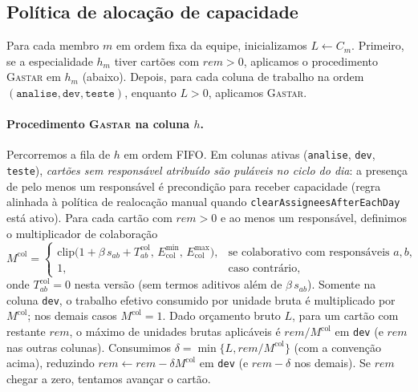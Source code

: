 \subsection{Política de alocação de capacidade}
Para cada membro $m$ em ordem fixa da equipe, inicializamos $L\leftarrow C_m$. Primeiro, se a especialidade $h_m$ tiver cartões com $\textit{rem}>0$, aplicamos o procedimento \textsc{Gastar} em $h_m$ (abaixo). Depois, para cada coluna de trabalho na ordem $(\texttt{analise},\texttt{dev},\texttt{teste})$, enquanto $L>0$, aplicamos \textsc{Gastar}.

\paragraph{Procedimento \textsc{Gastar} na coluna $h$.}
Percorremos a fila de $h$ em ordem FIFO. Em colunas ativas (\texttt{analise}, \texttt{dev}, \texttt{teste}), \emph{cartões sem responsável atribuído são puláveis no ciclo do dia}: a presença de pelo menos um responsável é precondição para receber capacidade (regra alinhada à política de realocação manual quando \texttt{clearAssigneesAfterEachDay} está ativo). Para cada cartão com $\textit{rem}>0$ e ao menos um responsável, definimos o multiplicador de colaboração
\[
M^{\text{col}} =
\begin{cases}
\mathrm{clip}\big(1+\beta\, s_{ab} + T^{\text{col}}_{ab},\,E^{\min}_{\text{col}},\,E^{\max}_{\text{col}}\big), & \text{se colaborativo com responsáveis }a,b,\\
1, & \text{caso contrário},
\end{cases}
\]
onde $T^{\text{col}}_{ab}=0$ nesta versão (sem termos aditivos além de $\beta\,s_{ab}$). Somente na coluna \texttt{dev}, o trabalho efetivo consumido por unidade bruta é multiplicado por $M^{\text{col}}$; nos demais casos $M^{\text{col}}=1$. Dado orçamento bruto $L$, para um cartão com restante $\textit{rem}$, o máximo de unidades brutas aplicáveis é $\textit{rem}/M^{\text{col}}$ em \texttt{dev} (e $\textit{rem}$ nas outras colunas). Consumimos $\delta=\min\{L,\textit{rem}/M^{\text{col}}\}$ (com a convenção acima), reduzindo $\textit{rem}\leftarrow \textit{rem}-\delta M^{\text{col}}$ em \texttt{dev} (e $\textit{rem}-\delta$ nos demais). Se $\textit{rem}$ chegar a zero, tentamos avançar o cartão.

